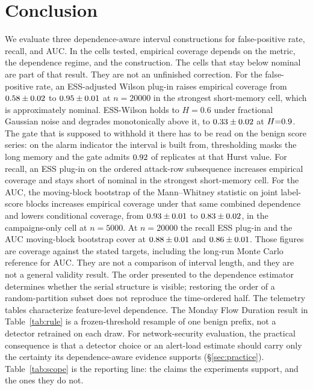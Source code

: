 \documentclass[a4paper,fleqn]{cas-dc}
\begin{document}
\section{Conclusion}
We evaluate three dependence-aware interval constructions for false-positive rate, recall, and AUC.
In the cells tested, empirical coverage depends on the metric, the dependence regime, and the
construction. The cells that stay below nominal are part of that result. They are not an unfinished
correction. For the false-positive rate, an ESS-adjusted Wilson plug-in raises
empirical coverage from $0.58\pm0.02$ to $0.95\pm0.01$ at $n{=}20000$ in the strongest
short-memory cell, which is approximately nominal. ESS-Wilson holds to $H{=}0.6$ under fractional Gaussian
noise and degrades monotonically above it, to $0.33\pm0.02$ at $H{=}0.9$. The gate that is
supposed to withhold it there has to be read on the benign score series: on the alarm indicator the
interval is built from, thresholding masks the long memory and the gate admits $0.92$ of
replicates at that Hurst value. For recall, an ESS plug-in on the ordered attack-row subsequence increases empirical
coverage and stays short of nominal in the strongest short-memory cell. For the AUC, the
moving-block bootstrap of the Mann--Whitney statistic on joint label-score blocks increases
empirical coverage under that same combined dependence and lowers conditional coverage, from
$0.93\pm0.01$ to $0.83\pm0.02$, in the campaigns-only cell at $n{=}5000$. At
$n{=}20000$ the recall ESS plug-in and the AUC moving-block bootstrap cover at $0.88\pm0.01$ and
$0.86\pm0.01$. Those figures are coverage against the stated targets, including the long-run Monte
Carlo reference for AUC. They are not a comparison of
interval length, and they are not a general validity result. The order presented to the dependence
estimator determines whether the serial structure is visible; restoring the order of a
random-partition subset does not reproduce the time-ordered half. The telemetry tables characterize
feature-level dependence. The Monday Flow Duration result in Table~\ref{tab:rule} is a frozen-threshold resample of one benign prefix, not a detector retrained on each draw. For network-security evaluation, the practical consequence is that a detector choice or an alert-load estimate should carry only the certainty its dependence-aware evidence supports (\S\ref{sec:practice}). Table~\ref{tab:scope} is the reporting line: the claims the experiments support, and the ones they do not.
\end{document}
